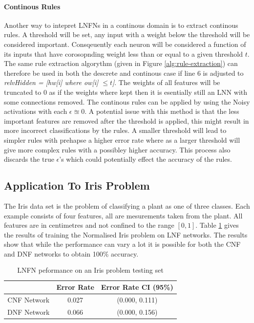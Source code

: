 \paragraph{Continous Rules}
Another way to intepret LNFNs in a continous domain is to extract continous rules. A threshold will be set, any input with a weight below the threshold will be considered important. Consqeuently each neuron will be considered a function of its inputs that have corosopnding weight less than or equal to a given threshold $t$. The same rule extraction algorythm (given in Figure \ref{alg:rule-extraction}) can therefore be used in both the descrete and continous case if line 6 is adjusted to \textit{relvHidden = [hw[i] where ow[i] $\leq t$]}. The weights of all features will be truncated to 0 as if the weights where kept then it is esentially still an LNN with some connections removed. The continous rules can be applied by using the Noisy activations with each $\epsilon \approxeq 0$. A potential issue with this method is that the less important features are removed after the threshold is applied, this might result in more incorrect classifications by the rules. A smaller threshold will lead to simpler rules with prehapse a higher error rate where as a larger threshold will give more complex rules with a possibley higher accuracy. This process also discards the true $\epsilon$'s which could potentially effect the accuracy of the rules.

\subsection{Application To Iris Problem}


The Iris data set \cite{Lichman:2013} is the problem of classifying a plant as one of three classes. Each example consists of four features, all are mesurements taken from the plant. All features are in centimetres and not confined to the range $[0, 1]$. Table \ref{tab:iris-network-peformance-comp} gives the results of training the Normalised Iris problem on LNF networks. The results show that while the performance can vary a lot it is possible for both the CNF and DNF networks to obtain 100\% accuracy.

\begin{table}[H]
	\begin{center}
		\begin{tabular}{| c | c | c |}
			\hline
			& Error Rate & Error Rate CI (95\%) \\
			\hline
			\hline
			CNF Network & 0.027 & (0.000, 0.111) \\
			\hline
			DNF Network & 0.066 & (0.000, 0.156) \\
			\hline
		\end{tabular}
	\end{center}
	\caption{LNFN peformance on an Iris problem testing set}
	\label{tab:iris-network-peformance-comp}
\end{table}

